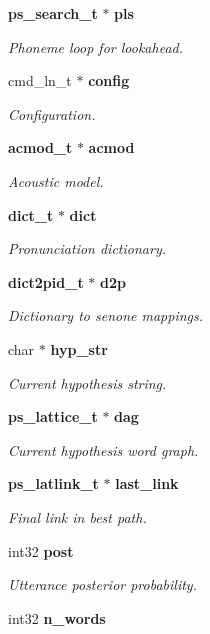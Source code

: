 \begin{DoxyCompactItemize}
\item 
{\bf ps\-\_\-search\-\_\-t} $\ast$ {\bf pls}
\begin{DoxyCompactList}\small\item\em Phoneme loop for lookahead. \end{DoxyCompactList}\item 
cmd\-\_\-ln\-\_\-t $\ast$ {\bf config}
\begin{DoxyCompactList}\small\item\em Configuration. \end{DoxyCompactList}\item 
{\bf acmod\-\_\-t} $\ast$ {\bf acmod}
\begin{DoxyCompactList}\small\item\em Acoustic model. \end{DoxyCompactList}\item 
{\bf dict\-\_\-t} $\ast$ {\bf dict}
\begin{DoxyCompactList}\small\item\em Pronunciation dictionary. \end{DoxyCompactList}\item 
{\bf dict2pid\-\_\-t} $\ast$ {\bf d2p}
\begin{DoxyCompactList}\small\item\em Dictionary to senone mappings. \end{DoxyCompactList}\item 
char $\ast$ {\bf hyp\-\_\-str}
\begin{DoxyCompactList}\small\item\em Current hypothesis string. \end{DoxyCompactList}\item 
{\bf ps\-\_\-lattice\-\_\-t} $\ast$ {\bf dag}
\begin{DoxyCompactList}\small\item\em Current hypothesis word graph. \end{DoxyCompactList}\item 
{\bf ps\-\_\-latlink\-\_\-t} $\ast$ {\bf last\-\_\-link}
\begin{DoxyCompactList}\small\item\em Final link in best path. \end{DoxyCompactList}\item 
int32 {\bf post}
\begin{DoxyCompactList}\small\item\em Utterance posterior probability. \end{DoxyCompactList}\item 
int32 {\bf n\-\_\-words}\label{structps__search__s_ad4d98deb905bd664ec44313ea0065b1a}


\end{DoxyCompactItemize}

